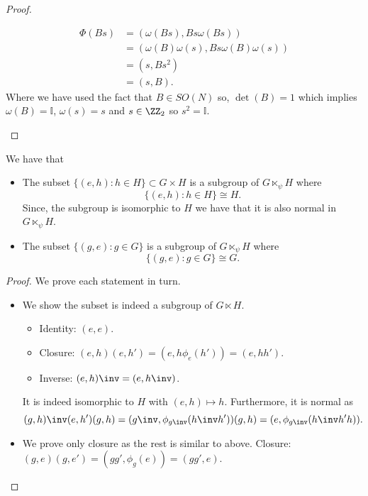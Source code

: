 \documentclass[12pt, a4paper]{article}
\begin{document}
\begin{proof}
\begin{enumerate}
\begin{itemize}
\begin{itemize}
\[\begin{aligned}
                            \Phi(Bs) &= (\omega(Bs),Bs\omega(Bs)) \\
                            &= (\omega(B)\omega(s),Bs\omega(B)\omega(s))\\
                            &= (s,Bs^2) \\
                            &= (s,B).
                        \end{aligned}\]
                        Where we have used the fact that \(B \in SO(N)\) so, \(\det(B)=1\) which implies \(\omega(B)=\mathbb{I}\), \(\omega(s)=s\) and \(s \in \ZZ_2\) so \(s^2 = \mathbb{I}\).
                    \end{itemize}
        \end{itemize}
    \end{enumerate}
\end{proof}

\begin{mdthm}
    We have that 
    \begin{itemize}
        \item The subset \(\{(e,h) : h \in H\} \subset G \times H\) is a subgroup of \(G \ltimes_{\psi} H\) where 
        \[\{(e,h) : h \in H\} \cong H.\]
        Since, the subgroup is isomorphic to \(H\) we have that it is also normal in \(G \ltimes_{\psi} H\).
        \item The subset \(\{(g,e) : g\in G\}\) is a subgroup of \(G \ltimes_{\psi} H\) where 
        \[\{(g,e) : g \in G\} \cong G.\]
    \end{itemize}
\end{mdthm}

\begin{proof}
    We prove each statement in turn.
    \begin{itemize}
        \item We show the subset is indeed a subgroup of \(G \ltimes H\).
        \begin{itemize}
            \item Identity: \((e,e)\).
            \item Closure: \((e,h)(e,h')=(e,h\phi_e(h'))=(e,hh')\).
            \item Inverse: \((e,h)\inv = (e,h\inv)\).
        \end{itemize}
        It is indeed isomorphic to \(H\) with \((e,h) \mapsto h\). Furthermore, it is normal as 
        \[(g,h)\inv(e,h')(g,h)=(g\inv,\phi_{g\inv}(h\inv h'))(g,h)=(e,\phi_{g\inv}(h\inv h'h)).\]
        \item We prove only closure as the rest is similar to above. Closure: \((g,e)(g,e')=(gg',\phi_g (e))=(gg',e)\).
    \end{itemize}
\end{proof}
\end{document}

